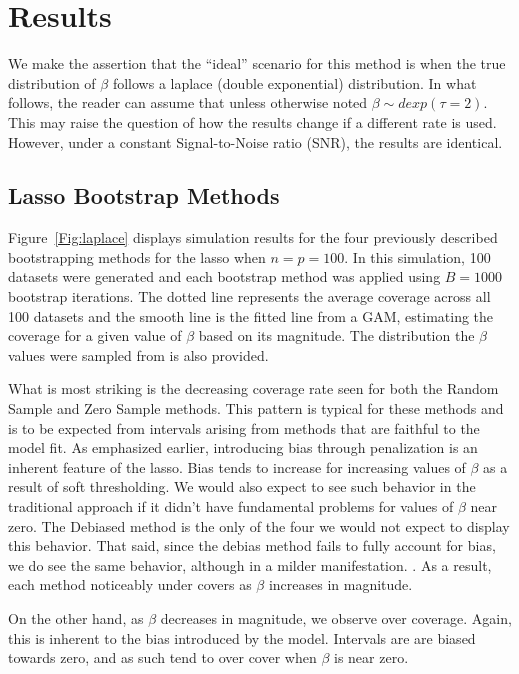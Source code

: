 \section{Results}

We make the assertion that the ``ideal'' scenario for this method is when the true distribution of $\beta$ follows a laplace (double exponential) distribution. In what follows, the reader can assume that unless otherwise noted $\beta \sim dexp(\tau = 2)$. This may raise the question of how the results change if a different rate is used. However, under a constant Signal-to-Noise ratio (SNR), the results are identical.

\subsection{Lasso Bootstrap Methods}

Figure~\ref{Fig:laplace} displays simulation results for the four previously described bootstrapping methods for the lasso when $n = p = 100$. In this simulation, 100 datasets were generated and each bootstrap method was applied using $B = 1000$ bootstrap iterations. The dotted line represents the average coverage across all 100 datasets and the smooth line is the fitted line from a GAM, estimating the coverage for a given value of $\beta$ based on its magnitude. The distribution the $\beta$ values were sampled from is also provided.

What is most striking is the decreasing coverage rate seen for both the Random Sample and Zero Sample methods. This pattern is typical for these methods and is to be expected from intervals arising from methods that are faithful to the model fit. As emphasized earlier, introducing bias through penalization is an inherent feature of the lasso. Bias tends to increase for increasing values of $\beta$ as a result of soft thresholding. We would also expect to see such behavior in the traditional approach if it didn't have fundamental problems for values of $\beta$ near zero. The Debiased method is the only of the four we would not expect to display this behavior. That said, since the debias method fails to fully account for bias, we do see the same behavior, although in a milder manifestation. . As a result, each method noticeably under covers as $\beta$ increases in magnitude. 

On the other hand, as $\beta$ decreases in magnitude, we observe over coverage. Again, this is inherent to the bias introduced by the model. Intervals are are biased towards zero, and as such tend to over cover when $\beta$ is near zero.

